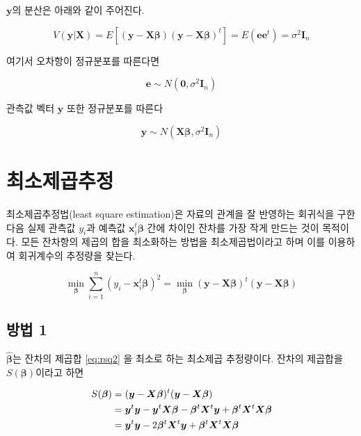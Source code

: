 \documentclass[
]{book}
\theoremstyle{definition}
\theoremstyle{definition}
\theoremstyle{definition}
\theoremstyle{remark}
\begin{document}
\(\bm y\)의 분산은 아래와 같이 주어진다.

\begin{equation}
 V( \bm y| \bm X) = E[( \bm y -  \bm X \bm \beta)( \bm y -  \bm X \bm \beta)^t] = E( \bm  e   \bm  e^t) = \sigma^2 \bm I_n
\label{eq:multiregvar}
\end{equation}

여기서 오차항이 정규분포를 따른다면

\[ \bm  e   \sim N(\bm 0,\sigma^2 \bm I_n) \]

관측값 벡터 \(\bm y\) 또한 정규분포를 따른다

\[  \bm y \sim N( \bm X \bm \beta, \sigma^2 \bm I_n) \]

\hypertarget{uxcd5cuxc18cuxc81cuxacf1uxcd94uxc815}{%
\section{최소제곱추정}\label{uxcd5cuxc18cuxc81cuxacf1uxcd94uxc815}}

최소제곱추정법(least square estimation)은 자료의 관계을 잘 반영하는 회귀식을 구한 다음 실제 관측값 \(y_i\)과 예측값 \(\bm x_i^t \bm \beta\) 간에 차이인 잔차를 가장 작게 만드는 것이 목적이다. 모든 잔차항의 제곱의 합을 최소화하는 방법을 최소제곱법이라고 하며 이를 이용하여 회귀계수의 추정량을 찾는다.

\begin{equation} 
 \min_{\bm \beta} \sum_{i=1}^n (y_i -  \bm x_i^t \bm \beta )^2 = \min_{\bm \beta } ( \bm y -  \bm X \bm \beta )^t( \bm y -  \bm X \bm \beta ) 
 \label{eq:rsq2}
 \end{equation}

\hypertarget{uxbc29uxbc95-1}{%
\subsection{방법 1}\label{uxbc29uxbc95-1}}

\(\hat {\bm \beta}\)는 잔차의 제곱합 \eqref{eq:rsq2} 을 최소로 하는 최소제곱 추정량이다. 잔차의 제곱합을 \(S( \bm \beta)\)이라고 하면

\begin{align} 
S( \bm \beta ) & =  ( \bm y -  \bm X \bm \beta)^t( \bm y -  \bm X \bm \beta ) \notag \\
  & = \bm y^t \bm y - \bm y^t \bm X \bm \beta - \bm \beta^t \bm X^t \bm y
    + \bm \beta^t \bm X^t \bm X \bm \beta \notag \\
  & = \bm y^t \bm y -2  \bm \beta^t \bm X^t \bm y
    + \bm \beta^t \bm X^t \bm X \bm \beta \label{eq:rsq3}   
\end{align}
\end{document}
